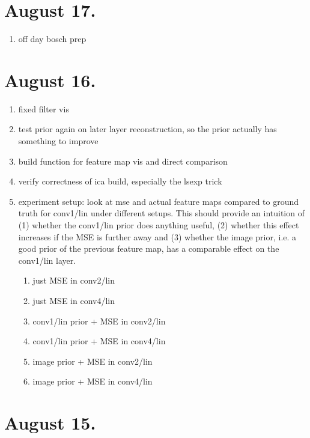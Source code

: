 \documentclass{article}
\begin{document}
\section{August 17.}

\begin{enumerate}
	\item off day bosch prep
\end{enumerate}


\section{August 16.}

\begin{enumerate}
	\item fixed filter vis
	\item test prior again on later layer reconstruction, so the prior actually has something to improve
	\item build function for feature map vis and direct comparison
	\item verify correctness of ica build, especially the lsexp trick
	\item experiment setup: look at mse and actual feature maps compared to ground truth for conv1/lin under different setups.
	This should provide an intuition of (1) whether the conv1/lin prior does anything useful, (2) whether this effect increases if the MSE is further away and (3) whether the image prior, i.e. a good prior of the previous feature map, has a comparable effect on the conv1/lin layer.
	\begin{enumerate}
		\item just MSE in conv2/lin
		\item just MSE in conv4/lin
		\item conv1/lin prior + MSE in conv2/lin
		\item conv1/lin prior + MSE in conv4/lin
		\item image prior + MSE in conv2/lin
		\item image prior + MSE in conv4/lin		
	\end{enumerate}
	
\end{enumerate}


\section{August 15.}
\end{document}
